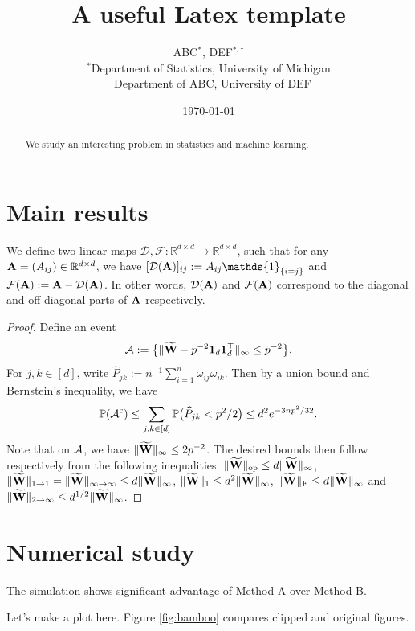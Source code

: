 \documentclass[11pt]{article}
\title{A useful Latex template}
\author{ABC$^\ast$, DEF$^{\ast,\dagger}$ \\
 \normalsize
 $^\ast$Department of Statistics, University of Michigan \\ \normalsize
 $^\dagger$ Department of ABC, University of DEF \\
\date{\today} }
\newcommand{\bfsym}[1]{\ensuremath{\boldsymbol{#1}}}
\def \bone   {\bfsym{1}}
\def \PP {\mathbb{P}}
\newcommand{\beq}  {\begin{equation}}
\newcommand{\eeq}  {\end{equation}}
\theoremstyle{definition}
\theoremstyle{plain}
\begin{document}
\maketitle

\begin{abstract}
  We study an interesting problem in statistics and machine learning. 
\end{abstract}

\section{Main results}

\label{Sec:Proofs}
We define two linear maps $\mathcal{D}, \mathcal{F}: \mathbb{R}^{d\times d}\to \mathbb{R}^{d\times d}$, such that for any $\mathbf{A} = (A_{ij}) \in\mathbb{R}^{d\times d}$, we have $[\mathcal{D}(\bA)]_{ij} := A_{ij}\mathds{1}_{\{i=j\}}$ and $\mathcal{F}(\mathbf{A}) := \mathbf{A} - \mathcal{D}(\mathbf{A})$. In other words, $\mathcal{D}(\mathbf{A})$ and $\mathcal{F}(\mathbf{A})$ correspond to the diagonal and off-diagonal parts of $\mathbf{A}$ respectively.

\begin{proof}
Define an event
\beq
\cA := \bigl\{\|\widetilde \bW - p^{-2}\bone_d \bone_d^\top\|_\infty \leq p^{-2}\bigr\}.
\eeq
For $j,k\in[d]$, write $\widehat P_{jk} := n^{-1} \sum_{i = 1}^n \omega_{ij}\omega_{ik}$. Then by a union bound and Bernstein's inequality, we have
\[
\PP(\cA^{\mathrm{c}}) \leq \sum_{j,k\in [d]} \PP\bigl(\widehat P_{jk} < p^2/2\bigr) \leq d^2 e^{-3np^2/32}.
\]
Note that on ${\cal A}$, we have $\|\widetilde {\mathbf{W}}\|_\infty \leq 2p^{-2}$. The desired bounds then follow respectively from the following inequalities: $\|\widetilde {\mathbf{W}}\|_{\mathrm{op}} \leq d\|\widetilde {\mathbf{W}}\|_\infty$, $\|\widetilde {\mathbf{W}}\|_{1\to 1} = \|\widetilde {\mathbf{W}}\|_{\infty\to\infty} \leq d\|\widetilde {\mathbf{W}}\|_\infty$, $\|\widetilde {\mathbf{W}}\|_1 \leq d^2 \|\widetilde {\mathbf{W}}\|_\infty$, $\|\widetilde {\mathbf{W}}\|_{\mathrm{F}} \leq d\|\widetilde {\mathbf{W}}\|_\infty$ and $\|\widetilde {\mathbf{W}}\|_{2\to\infty} \leq d^{1/2}\|\widetilde {\mathbf{W}}\|_\infty$. 
\end{proof}

\section{Numerical study}

The simulation shows significant advantage of Method A over Method B. 

\newpage 

Let's make a plot here. Figure \ref{fig:bamboo} compares clipped and original figures. 
\end{document}
